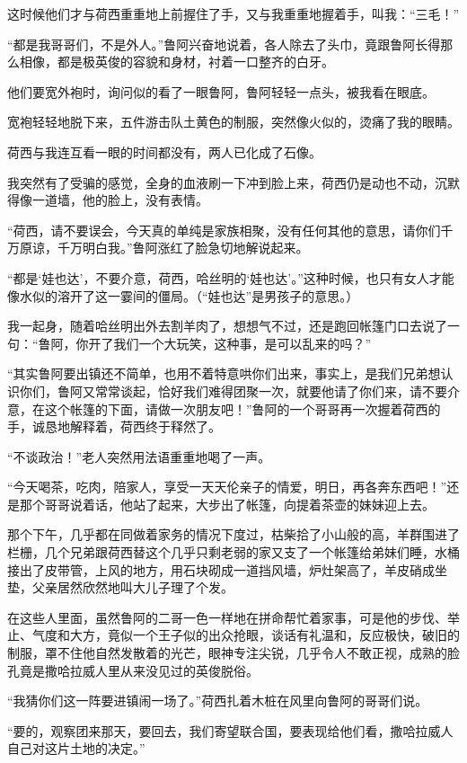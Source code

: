 \par 这时候他们才与荷西重重地上前握住了手，又与我重重地握着手，叫我：“三毛！”
\par “都是我哥哥们，不是外人。”鲁阿兴奋地说着，各人除去了头巾，竟跟鲁阿长得那么相像，都是极英俊的容貌和身材，衬着一口整齐的白牙。
\par 他们要宽外袍时，询问似的看了一眼鲁阿，鲁阿轻轻一点头，被我看在眼底。
\par 宽袍轻轻地脱下来，五件游击队土黄色的制服，突然像火似的，烫痛了我的眼睛。
\par 荷西与我连互看一眼的时间都没有，两人已化成了石像。
\par 我突然有了受骗的感觉，全身的血液刷一下冲到脸上来，荷西仍是动也不动，沉默得像一道墙，他的脸上，没有表情。
\par “荷西，请不要误会，今天真的单纯是家族相聚，没有任何其他的意思，请你们千万原谅，千万明白我。”鲁阿涨红了脸急切地解说起来。
\par “都是‘娃也达’，不要介意，荷西，哈丝明的‘娃也达’。”这种时候，也只有女人才能像水似的溶开了这一霎间的僵局。（“娃也达”是男孩子的意思。）
\par 我一起身，随着哈丝明出外去割羊肉了，想想气不过，还是跑回帐篷门口去说了一句：“鲁阿，你开了我们一个大玩笑，这种事，是可以乱来的吗？”
\par “其实鲁阿要出镇还不简单，也用不着特意哄你们出来，事实上，是我们兄弟想认识你们，鲁阿又常常谈起，恰好我们难得团聚一次，就要他请了你们来，请不要介意，在这个帐篷的下面，请做一次朋友吧！”鲁阿的一个哥哥再一次握着荷西的手，诚恳地解释着，荷西终于释然了。
\par “不谈政治！”老人突然用法语重重地喝了一声。
\par “今天喝茶，吃肉，陪家人，享受一天天伦亲子的情爱，明日，再各奔东西吧！”还是那个哥哥说着话，他站了起来，大步出了帐篷，向提着茶壶的妹妹迎上去。
\par 那个下午，几乎都在同做着家务的情况下度过，枯柴拾了小山般的高，羊群围进了栏栅，几个兄弟跟荷西替这个几乎只剩老弱的家又支了一个帐篷给弟妹们睡，水桶接出了皮带管，上风的地方，用石块砌成一道挡风墙，炉灶架高了，羊皮硝成坐垫，父亲居然欣然地叫大儿子理了个发。
\par 在这些人里面，虽然鲁阿的二哥一色一样地在拼命帮忙着家事，可是他的步伐、举止、气度和大方，竟似一个王子似的出众抢眼，谈话有礼温和，反应极快，破旧的制服，罩不住他自然发散着的光芒，眼神专注尖锐，几乎令人不敢正视，成熟的脸孔竟是撒哈拉威人里从来没见过的英俊脱俗。
\par “我猜你们这一阵要进镇闹一场了。”荷西扎着木桩在风里向鲁阿的哥哥们说。
\par “要的，观察团来那天，要回去，我们寄望联合国，要表现给他们看，撒哈拉威人自己对这片土地的决定。”

